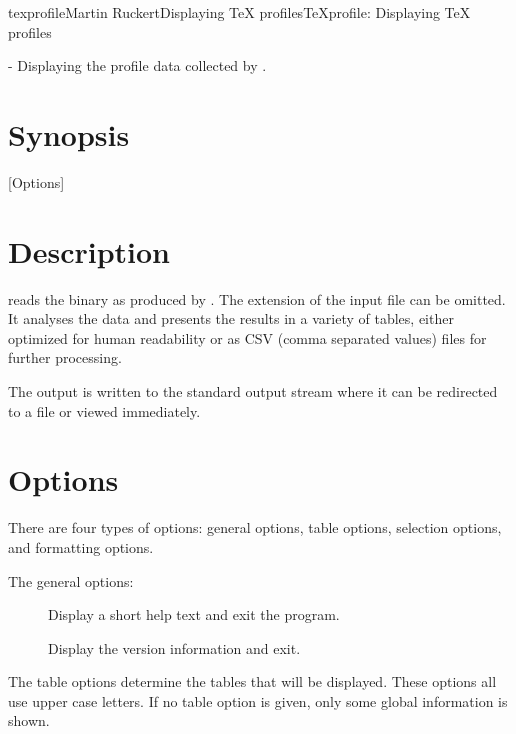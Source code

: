 \documentclass[a4paper,english]{article}
\begin{document}
\begin{Name}{1}{texprofile}{Martin Ruckert}{Displaying TeX profiles}{TeXprofile: Displaying TeX profiles}
  
   - Displaying the profile data collected by .
\end{Name}

\section{Synopsis}

 [Options] 

\section{Description}
 reads the binary  as produced by
.  The extension  of the input file can be
omitted. It analyses the data and presents the results in a variety of
tables, either optimized for human readability or as CSV (comma
separated values) files for further processing.

The output is written to the standard output stream where it can be redirected
to a file or viewed immediately.

\section{Options}
There are four types of options: general options, table options,
selection options, and formatting options.

The general options:
\begin{description}
\item[  ]
  Display a short help text and exit the program.
\item[]
  Display the version information and exit.
\end{description}

The table options determine the tables that will be displayed.
These options all use upper case letters.
If no table option is given, only some global information is shown.
\end{document}
